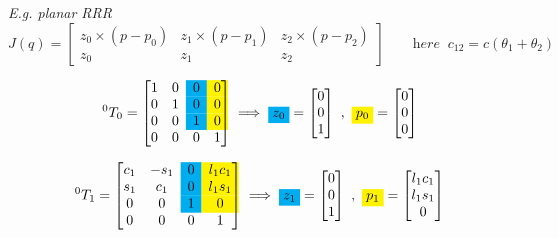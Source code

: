 \vspace*{8pt}
\textit{E.g. planar RRR}
$$
J(q)
=
\begin{bmatrix}
	z_0 \times (p - p_0) & z_1 \times (p - p_1) & z_2 \times (p - p_2) \\
	z_0 & z_1 & z_2
\end{bmatrix}
\qquad
\textit{here } \ c_{12} = c(\theta_1+\theta_2)
$$

\newcolumn
\vspace*{-18pt}
\begin{equation*}  
	{}^0T_0
	=
	\begin{bmatrix}
		1 & 0 & \cellcolor{cyan}0 & \cellcolor{yellow}0 \\
		0 & 1 & \cellcolor{cyan}0 & \cellcolor{yellow}0 \\
		0 & 0 & \cellcolor{cyan}1 & \cellcolor{yellow}0 \\
		0 & 0 & 0 & 1 \\
	\end{bmatrix}
	\implies
	\colorbox{cyan}{$z_0$}
	=
	\begin{bmatrix}
		0 \\ 0 \\ 1
	\end{bmatrix}
	\ , \
	\colorbox{yellow}{$p_0$}
	=
	\begin{bmatrix}
		0 \\ 0 \\ 0
	\end{bmatrix}
\end{equation*}

\begin{equation*}
	{}^0T_1
	=
	\begin{bmatrix}
		c_1 & -s_1 & \cellcolor{cyan}0 & \cellcolor{yellow}l_1 c_1 \\
		s_1 & c_1 & \cellcolor{cyan}0 & \cellcolor{yellow}l_1 s_1 \\
		0 & 0 & \cellcolor{cyan}1 & \cellcolor{yellow}0 \\
		0 & 0 & 0 & 1 \\
	\end{bmatrix}
	\implies
	\colorbox{cyan}{$z_1$}
	=
	\begin{bmatrix}
		0 \\ 0 \\ 1
	\end{bmatrix}
	\ , \
	\colorbox{yellow}{$p_1$}
	=
	\begin{bmatrix}
		l_1 c_1 \\ l_1 s_1 \\ 0
	\end{bmatrix}
\end{equation*}

